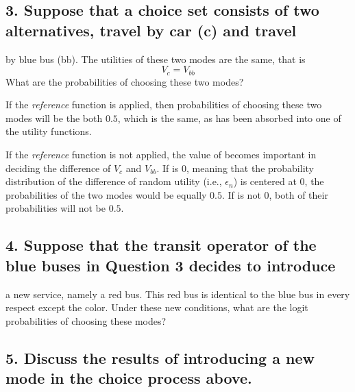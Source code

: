 \documentclass[
]{article}
\begin{document}
\subsection{3. Suppose that a choice set consists of two alternatives,
travel by car (c) and
travel}\label{suppose-that-a-choice-set-consists-of-two-alternatives-travel-by-car-c-and-travel}

by blue bus (bb). The utilities of these two modes are the same, that is
\[
V_{c} = V_{bb}
\] What are the probabilities of choosing these two modes?

If the \emph{reference} function is applied, then probabilities of
choosing these two modes will be the both \(0.5\), which is the same, as
\mu has been absorbed into one of the utility functions.

If the \emph{reference} function is not applied, the value of
\mu becomes important in deciding the difference of \(V_{c}\) and
\(V_{bb}\). If \mu is 0, meaning that the probability distribution of
the difference of random utility (i.e., \(\epsilon_{n}\)) is centered at
0, the probabilities of the two modes would be equally \(0.5\). If
\mu is not 0, both of their probabilities will not be \(0.5\).

\subsection{4. Suppose that the transit operator of the blue buses in
Question 3 decides to
introduce}\label{suppose-that-the-transit-operator-of-the-blue-buses-in-question-3-decides-to-introduce}

a new service, namely a red bus. This red bus is identical to the blue
bus in every respect except the color. Under these new conditions, what
are the logit probabilities of choosing these modes?

\subsection{5. Discuss the results of introducing a new mode in the
choice process
above.}\label{discuss-the-results-of-introducing-a-new-mode-in-the-choice-process-above.}
\end{document}

